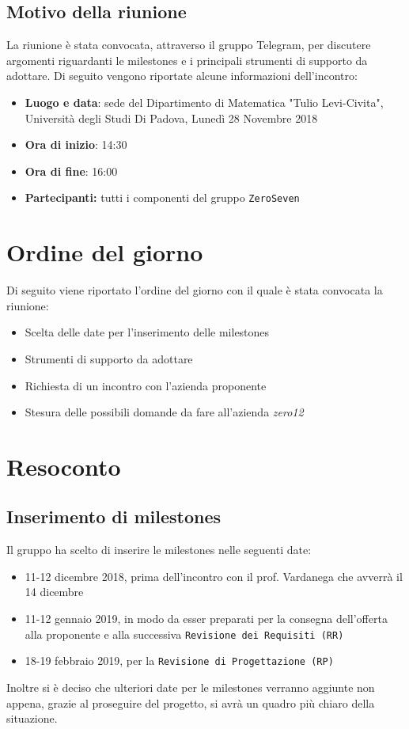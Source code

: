 \documentclass[a4paper,12pt]{article}
\begin{document}
	\subsection{Motivo della riunione}
	La riunione è stata convocata, attraverso il gruppo Telegram, per discutere argomenti riguardanti le milestones e i principali strumenti di supporto da adottare.
	Di seguito vengono riportate alcune informazioni dell'incontro:
	\begin{itemize}
		\item \textbf{Luogo e data}: sede del Dipartimento di Matematica "Tulio Levi-Civita", Università degli Studi Di Padova, Lunedì 28 Novembre 2018
		\item \textbf{Ora di inizio}: 14:30
		\item \textbf{Ora di fine}: 16:00
		\item \textbf{Partecipanti: } tutti i componenti del gruppo \texttt{ZeroSeven} 
	\end{itemize}
	\section{Ordine del giorno}
	Di seguito viene riportato l'ordine del giorno con il quale è stata convocata la riunione:
	\begin{itemize}
		\item Scelta delle date per l'inserimento delle milestones
		\item Strumenti di supporto da adottare
		\item Richiesta di un incontro con l'azienda proponente
		\item Stesura delle possibili domande da fare all'azienda \textit{zero12}
	\end{itemize}
	\section{Resoconto}
	\subsection{Inserimento di milestones}
	Il gruppo ha scelto di inserire le milestones nelle seguenti date:
	\begin{itemize}
		\item 11-12 dicembre 2018, prima dell'incontro con il prof. Vardanega che avverrà il 14 dicembre
		\item 11-12 gennaio 2019, in modo da esser preparati per la consegna dell'offerta alla proponente e alla successiva \texttt{Revisione dei Requisiti (RR)}
		\item 18-19 febbraio 2019, per la \texttt{Revisione di Progettazione (RP)}
	\end{itemize}
	Inoltre si è deciso che ulteriori date per le milestones verranno aggiunte non appena, grazie al proseguire del progetto, si avrà un quadro più chiaro della situazione.
\end{document}
